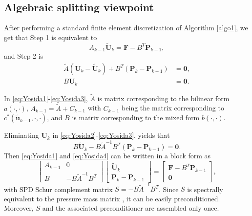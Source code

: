 \documentclass[3p]{elsarticle}
\def\V#1{\mathbf{#1}}
\def\Vt#1{\mathbf{\tilde{#1}}}
\begin{document}
\subsection{Algebraic splitting viewpoint}
After performing a standard finite element discretization of Algorithm \ref{algo1}, we get that Step 1 is equivalent to
\begin{equation}
\label{eq:Yosida1}
A_{k-1} \Vt{U}_k = \V{F} - B^T \V{P}_{k-1},  
\end{equation}
and Step 2 is
\begin{align}
\widetilde{A} \left(\V{U}_k-\Vt{U}_k \right) + B^T \left(\V{P}_k - \V{P}_{k-1} \right) &= \V{0}, \label{eq:Yosida2}  \\
B \V{U}_k &= \V{0}. \label{eq:Yosida3}
\end{align}

In \eqref{eq:Yosida1}-\eqref{eq:Yosida3}, $\widetilde{A}$ is matrix corresponding to the bilinear form $a(\cdot,\cdot)$, $A_{k-1} = \widetilde{A} + C_{k-1}$ with $C_{k-1}$ being the matrix corresponding to $c^*(\Vt{u}_{k-1},\cdot,\cdot)$, and $B$ is matrix corresponding to the mixed form $b(\cdot,\cdot)$.

Eliminating $\V{U}_k$ in \eqref{eq:Yosida2}-\eqref{eq:Yosida3}, yields that
\begin{equation}
    \label{eq:Yosida4}
   B\Vt{U}_k - B\widetilde{A}^{-1} B^T \left(\V{P}_k - \V{P}_{k-1} \right) = \V{0}. 
\end{equation}
Then \eqref{eq:Yosida1} and \eqref{eq:Yosida4} can be written in a block form as
\begin{equation}\label{eq:Yosida5}
\begin{bmatrix} 
A_{k-1} & 0 \\ 
B &  -B\widetilde{A}^{-1} B^T 
\end{bmatrix} 
\begin{bmatrix} \Vt{U}_k \\
\V{P}_k - \V{P}_{k-1} 
\end{bmatrix} 
= 
\begin{bmatrix} \V{F} - B^T \V{P}_{k-1} 
\\ 
\V{0}
\end{bmatrix},
\end{equation}
with SPD Schur complement matrix $S=-B \widetilde{A}^{-1} B^T $. Since $S$ is spectrally equivalent to the pressure mass matrix \cite{BenGolLie2005}, it can be easily preconditioned. Moreover, $S$ and the associated preconditioner are assembled only once. 
\end{document}

